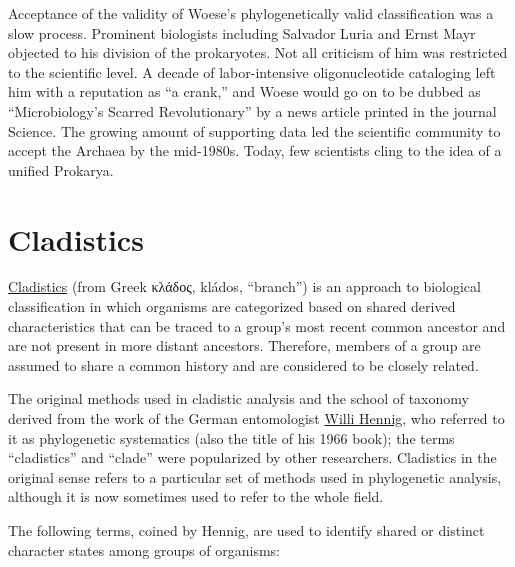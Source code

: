 Acceptance of the validity of Woese's phylogenetically valid classification was a slow process. Prominent biologists including Salvador Luria and Ernst Mayr objected to his division of the prokaryotes. Not all criticism of him was restricted to the scientific level. A decade of labor-intensive oligonucleotide cataloging left him with a reputation as ``a crank,'' and Woese would go on to be dubbed as ``Microbiology's Scarred Revolutionary'' by a news article printed in the journal Science. The growing amount of supporting data led the scientific community to accept the Archaea by the mid-1980s. Today, few scientists cling to the idea of a unified Prokarya.

\hypertarget{cladistics}{%
\section{Cladistics}\label{cladistics}}

\href{https://en.wikipedia.org/wiki/Cladistics}{Cladistics} (from Greek κλάδος, kládos, ``branch'') is an approach to biological classification in which organisms are categorized based on shared derived characteristics that can be traced to a group's most recent common ancestor and are not present in more distant ancestors. Therefore, members of a group are assumed to share a common history and are considered to be closely related.

The original methods used in cladistic analysis and the school of taxonomy derived from the work of the German entomologist \href{https://en.wikipedia.org/wiki/Willi_Hennig}{Willi Hennig}, who referred to it as phylogenetic systematics (also the title of his 1966 book); the terms ``cladistics'' and ``clade'' were popularized by other researchers. Cladistics in the original sense refers to a particular set of methods used in phylogenetic analysis, although it is now sometimes used to refer to the whole field.

The following terms, coined by Hennig, are used to identify shared or distinct character states among groups of organisms:

